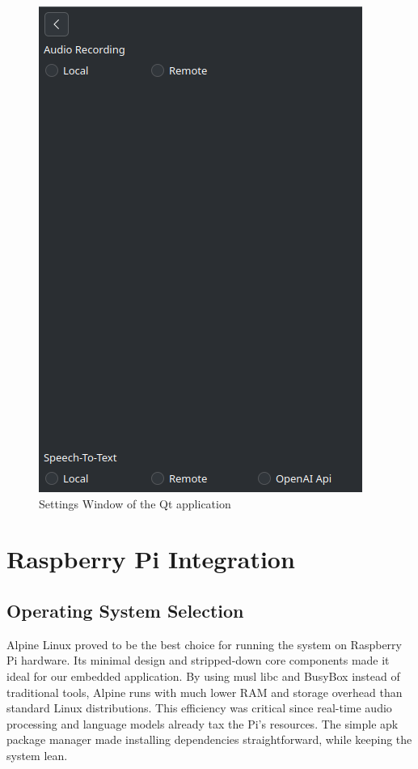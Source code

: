 \begin{figure}[H]
\begin{minipage}{0.45\textwidth}
    \includegraphics[width=\textwidth]{assets/settings_january.png}
    \caption{Settings Window of the Qt application}
    \label{fig:settings_january}
\end{minipage}
\end{figure}

\section{Raspberry Pi Integration}
\subsection{Operating System Selection}
Alpine Linux proved to be the best choice for running
the system on Raspberry Pi hardware. Its minimal design and
stripped-down core components made it ideal for our embedded
application. By using musl libc and BusyBox instead of traditional
tools, Alpine runs with much lower RAM and storage overhead
than standard Linux distributions. This efficiency was critical since
real-time audio processing and language models already tax the Pi's
resources. The simple apk package manager made installing dependencies straightforward,
while keeping the system lean.
